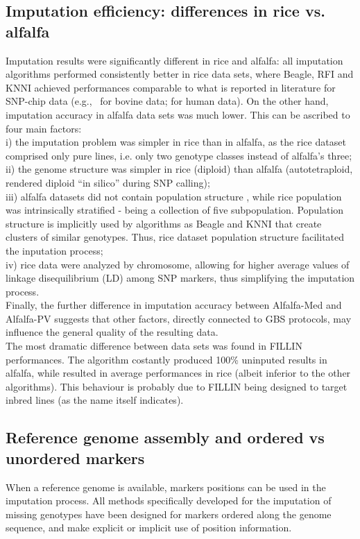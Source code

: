 \subsection{Imputation efficiency: differences in rice vs. alfalfa}
\label{sec:role_of_species}
Imputation results were significantly different in rice and alfalfa: all imputation algorithms performed consistently better in rice data sets, where Beagle, RFI and KNNI achieved performances comparable to what is reported in literature for SNP-chip data (e.g.,~\cite{vanraden_genomic_2013} for bovine data;
\cite{the_1000_genomes_project_consortium_integrated_2012}
for human data). On the other hand, imputation accuracy in alfalfa data sets was much lower. This can be ascribed to four main factors: \\
i) the imputation problem was simpler in rice than in alfalfa, as the rice dataset comprised only pure lines, i.e. only two genotype classes instead of alfalfa's three; \\
ii) the genome structure was simpler in rice (diploid) than alfalfa (autotetraploid, rendered diploid ``in silico'' during SNP calling);\\
iii) alfalfa datasets did not contain population structure \cite{Annicchiarico2015}, while rice population was intrinsically stratified - being a collection of five subpopulation. Population structure is implicitly used by algorithms as Beagle and KNNI that create clusters of similar genotypes. Thus, rice dataset population structure facilitated the inputation process;\\
iv) rice data were analyzed by chromosome, allowing for higher average values of linkage disequilibrium (LD) among SNP markers, thus simplifying the imputation process.\\
Finally, the further difference in imputation accuracy between Alfalfa-Med and Alfalfa-PV suggests that other factors, directly connected to GBS protocols, may influence the general quality of the resulting data.\\
The most dramatic difference between data sets was found in FILLIN performances. The algorithm costantly produced 100\% uninputed results in alfalfa, while resulted in average performances in rice (albeit inferior to the other algorithms). This behaviour is probably due to FILLIN being designed to target inbred lines (as the name itself indicates).

\subsection{Reference genome assembly and ordered vs unordered markers}
\label{sec:reference_genome_ordered_vs_unordered}
When a reference genome is available, markers positions can be used in the imputation process. All methods specifically developed for the imputation of missing genotypes have been designed for markers ordered along the genome sequence, and make explicit or implicit use of position information.

